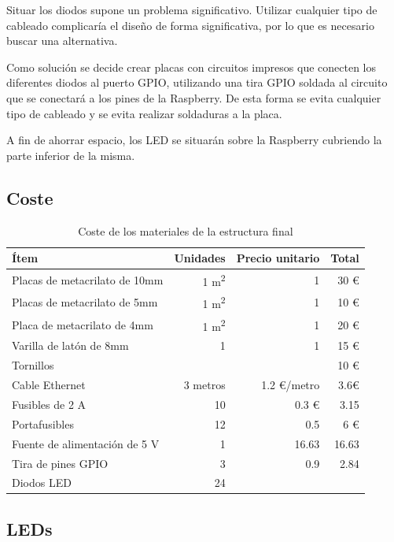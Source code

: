 Situar los diodos supone un problema significativo. Utilizar cualquier tipo de cableado complicaría el diseño de forma significativa, por lo que es necesario buscar una alternativa.

Como solución se decide crear placas con circuitos impresos que conecten los diferentes diodos al puerto GPIO, utilizando una tira GPIO soldada al circuito que se conectará a los pines de la Raspberry. De esta forma se evita cualquier tipo de cableado y se evita realizar soldaduras a la placa.

A fin de ahorrar espacio, los LED se situarán sobre la Raspberry cubriendo la parte inferior de la misma.

\subsection{Coste}
\label{coste}
\begin{table}[H]
\centering
\begin{tabular}{|l|r|r|r|}
\hline
\textbf{Ítem} & \textbf{Unidades} & \textbf{Precio unitario} & \textbf{Total} \\ \hline
Placas de metacrilato de 10mm & 1 m\textsuperscript{2} & 1 & 30 € \\ \hline
Placas de metacrilato de 5mm & 1 m\textsuperscript{2} & 1 & 10 € \\ \hline
Placa de metacrilato de 4mm & 1 m\textsuperscript{2} & 1 & 20 € \\ \hline
Varilla de latón de 8mm & 1 & 1& 15 €\\ \hline
Tornillos & & & 10 €\\ \hline
Cable Ethernet & 3 metros & 1.2 €/metro & 3.6€\\ \hline
Fusibles de 2 A & 10 & 0.3 € & 3.15\\ \hline
Portafusibles & 12 & 0.5 & 6 € \\ \hline
Fuente de alimentación de 5 V & 1 & 16.63 & 16.63 \\ \hline
Tira de pines GPIO & 3 & 0.9 & 2.84 \\ \hline
Diodos LED & 24 & &\\ \hline
\end{tabular}
\caption{Coste de los materiales de la estructura final}
\end{table}

\subsection{LEDs}

